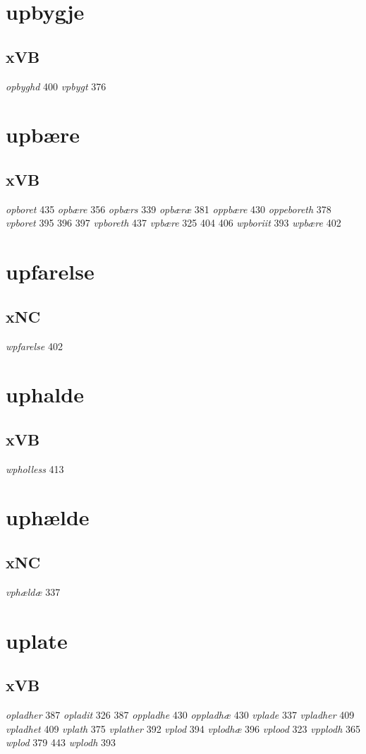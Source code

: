 \documentclass[a4paper,twocolumn]{article}
\begin{document}
\section{upbygje}
\label{sec:orgc9a343e}
\subsection{xVB}
\label{sec:orge04d047}
\emph{opbyghd} 400 \emph{vpbygt} 376 
\section{upbære}
\label{sec:orge0ca0b5}
\subsection{xVB}
\label{sec:org123c060}
\emph{opboret} 435 \emph{opbære} 356 \emph{opbærs} 339 \emph{opbæræ} 381 \emph{oppbære} 430 \emph{oppeboreth} 378 \emph{vpboret} 395 396 397 \emph{vpboreth} 437 \emph{vpbære} 325 404 406 \emph{wpboriit} 393 \emph{wpbære} 402 
\section{upfarelse}
\label{sec:org997c5fa}
\subsection{xNC}
\label{sec:org7e691f9}
\emph{wpfarelse} 402 
\section{uphalde}
\label{sec:org82173a2}
\subsection{xVB}
\label{sec:org13be563}
\emph{wpholless} 413 
\section{uphælde}
\label{sec:org78667c0}
\subsection{xNC}
\label{sec:org2e9b222}
\emph{vphældæ} 337 
\section{uplate}
\label{sec:org7a97f77}
\subsection{xVB}
\label{sec:org8d3a0e6}
\emph{opladher} 387 \emph{opladit} 326 387 \emph{oppladhe} 430 \emph{oppladhæ} 430 \emph{vplade} 337 \emph{vpladher} 409 \emph{vpladhet} 409 \emph{vplath} 375 \emph{vplather} 392 \emph{vplod} 394 \emph{vplodhæ} 396 \emph{vplood} 323 \emph{vpplodh} 365 \emph{wplod} 379 443 \emph{wplodh} 393 
\end{document}
